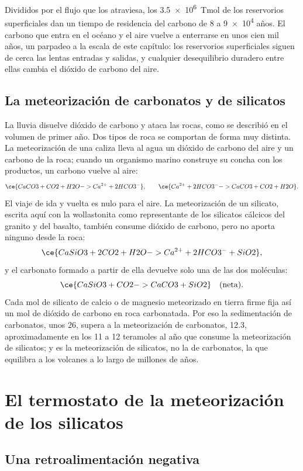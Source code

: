 Divididos por el flujo que los atraviesa, los \qty{3.5e6}{Tmol} de los reservorios superficiales dan un
tiempo de residencia del carbono de 8 a \num{9e4} años. El carbono que entra en el océano y el aire vuelve a enterrarse
en unos cien mil años, un parpadeo a la escala de este capítulo: los reservorios superficiales
siguen de cerca las lentas entradas y salidas, y cualquier desequilibrio duradero entre ellas
cambia el dióxido de carbono del aire.

\subsection*{La meteorización de carbonatos y de silicatos}

La lluvia disuelve dióxido de carbono y ataca las rocas, como se describió en el volumen de primer año. Dos tipos de roca
se comportan de forma muy distinta. La meteorización de una caliza lleva al agua un dióxido de carbono del aire y un
carbono de la roca; cuando un organismo marino construye su concha con los productos,
un carbono vuelve al aire:
\[
  \ce{CaCO3 + CO2 + H2O -> Ca^{2+} + 2 HCO3^-} , \qquad
  \ce{Ca^{2+} + 2 HCO3^- -> CaCO3 + CO2 + H2O} .
\]
El viaje de ida y vuelta es nulo para el aire. La meteorización de un silicato, escrita aquí con la wollastonita como
representante de los silicatos cálcicos del granito y del basalto, también consume dióxido de carbono, pero no aporta
ninguno desde la roca:
\[
  \ce{CaSiO3 + 2 CO2 + H2O -> Ca^{2+} + 2 HCO3^- + SiO2} ,
\]
y el carbonato formado a partir de ella devuelve solo una de las dos moléculas:
\[
  \ce{CaSiO3 + CO2 -> CaCO3 + SiO2} \quad\text{(neta)} .
\]
Cada mol de silicato de calcio o de magnesio meteorizado en tierra firme fija así un mol de dióxido de carbono
en roca carbonatada. Por eso la sedimentación de carbonatos, unos 26, supera a la meteorización de carbonatos,
12.3, aproximadamente en los 11 a 12 teramoles al año que consume la meteorización de silicatos; y es la
meteorización de silicatos, no la de carbonatos, la que equilibra a los volcanes a lo largo de millones de años.

\section{El termostato de la meteorización de los silicatos}\label{sec:b2:deep-time-climate:thermostat}

\subsection*{Una retroalimentación negativa}

